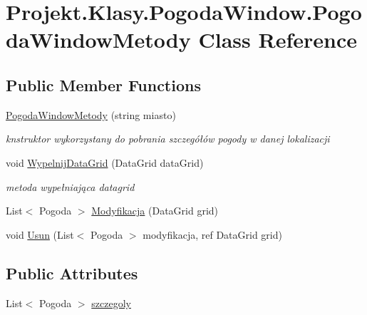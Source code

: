 \hypertarget{class_projekt_1_1_klasy_1_1_pogoda_window_1_1_pogoda_window_metody}{}\section{Projekt.\+Klasy.\+Pogoda\+Window.\+Pogoda\+Window\+Metody Class Reference}
\label{class_projekt_1_1_klasy_1_1_pogoda_window_1_1_pogoda_window_metody}
\subsection*{Public Member Functions}
\begin{DoxyCompactItemize}
\item 
\mbox{\hyperlink{class_projekt_1_1_klasy_1_1_pogoda_window_1_1_pogoda_window_metody_abe53aba461de3246639bd1e0995294ed}{Pogoda\+Window\+Metody}} (string miasto)
\begin{DoxyCompactList}\small\item\em knstruktor wykorzystany do pobrania szczegółów pogody w danej lokalizacji \end{DoxyCompactList}\item 
void \mbox{\hyperlink{class_projekt_1_1_klasy_1_1_pogoda_window_1_1_pogoda_window_metody_a650fb8b728ec602d71b1467fe0c78ea2}{Wypelnij\+Data\+Grid}} (Data\+Grid data\+Grid)
\begin{DoxyCompactList}\small\item\em metoda wypełniająca datagrid \end{DoxyCompactList}\item 
List$<$ Pogoda $>$ \mbox{\hyperlink{class_projekt_1_1_klasy_1_1_pogoda_window_1_1_pogoda_window_metody_a7f0a6388e9ab48961ef0360e9091ee46}{Modyfikacja}} (Data\+Grid grid)
\item 
void \mbox{\hyperlink{class_projekt_1_1_klasy_1_1_pogoda_window_1_1_pogoda_window_metody_ae8f5a295de3223c1ff949760eb1ce36e}{Usun}} (List$<$ Pogoda $>$ modyfikacja, ref Data\+Grid grid)
\end{DoxyCompactItemize}
\subsection*{Public Attributes}
\begin{DoxyCompactItemize}
\item 
List$<$ Pogoda $>$ \mbox{\hyperlink{class_projekt_1_1_klasy_1_1_pogoda_window_1_1_pogoda_window_metody_a83c3d93d6f5240995a53ed912484d500}{szczegoly}}
\end{DoxyCompactItemize}


